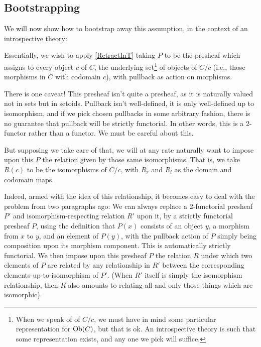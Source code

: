 \subsection{Bootstrapping}
We will now show how to bootstrap away this assumption, in the context of an introspective theory:

Essentially, we wish to apply \cref{RetractInT} taking $P$ to be the presheaf which assigns to every object $c$ of $C$, the underlying set\footnote{When we speak of  of $C/c$, we must have in mind some particular representation for $\operatorname{Ob}(C)$, but that is ok. An introspective theory is such that some representation exists, and any one we pick will suffice.} of objects of $C/c$ (i.e., those morphisms in $C$ with codomain $c$), with pullback as action on morphisms.

There is one caveat! This presheaf isn't quite a presheaf, as it is naturally valued not in sets but in setoids. Pullback isn't well-defined, it is only well-defined up to isomorphism, and if we pick chosen pullbacks in some arbitrary fashion, there is no guarantee that pullback will be strictly functorial. In other words, this is a 2-functor rather than a functor. We must be careful about this.

But supposing we take care of that, we will at any rate naturally want to impose upon this $P$ the relation given by those same isomorphisms. That is, we take $R(c)$ to be the isomorphisms of $C/c$, with $R_r$ and $R_l$ as the domain and codomain maps.

Indeed, armed with the idea of this relationship, it becomes easy to deal with the problem from two paragraphs ago: We can always replace a 2-functorial presheaf $P'$ and isomorphism-respecting relation $R'$ upon it, by a strictly functorial presheaf $P$, using the definition that $P(x)$ consists of an object $y$, a morphism from $x$ to $y$, and an element of $P(y)$, with the pullback action of $P$ simply being composition upon its morphism component. This is automatically strictly functorial. We then impose upon this presheaf $P$ the relation $R$ under which two elements of $P$ are related by any relationship in $R'$ between the corresponding elements-up-to-isomorphism of $P'$. (When $R'$ itself is simply the isomorphism relationship, then $R$ also amounts to relating all and only those things which are isomorphic). 

